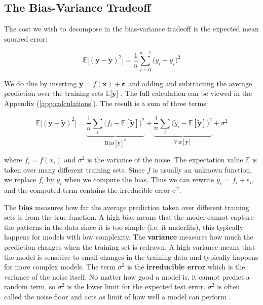 \documentclass[reprint,english,notitlepage]{revtex4-2}  %
\begin{document}
\subsection{The Bias-Variance Tradeoff} \label{sec:bv-tradeoff}

The cost we wish to decompose in the bias-variance tradeoff is the expected mean squared error:

\begin{equation*}
\mathbb{E}\big[(\mathbf{y} - \tilde{\mathbf{y}})^2\big]
= \frac{1}{n}\sum_{i=0}^{n-1} \big(y_i - \tilde{y}_i\big)^2
\end{equation*}

We do this by inserting $\bm{y} = f(\bm{x}) + \bm{\varepsilon}$ and adding and subtracting the average prediction over the training sets $\mathbb{E}\big[\mathbf{\tilde{y}}\big]$ \cite{lecture_book}. The full calculation can be viewed in the Appendix (\ref{app:calculations}). The result is a sum of three terms:

\begin{equation}\label{eq:bias_variance}
\mathbb{E}\big[(\mathbf{y} - \tilde{\mathbf{y}})^2\big]
= \underbrace{\frac{1}{n}\sum_i \big(f_i - \mathbb{E}[\tilde{\mathbf{y}}]\big)^2}_{\mathrm{Bias[\bm{\tilde{y}}]}^2}
+ \underbrace{\frac{1}{n}\sum_i \big(\tilde{y}_i - \mathbb{E}[\tilde{\mathbf{y}}]\big)^2}_{\mathrm{Var}[\tilde{\mathbf{y}}]}
+ \sigma^2
\end{equation}

where $f_i = f(x_i)$ and $\sigma^2$ is the variance of the noise. The expectation value $\mathbb{E}$ is taken over many different training sets. Since $f$ is usually an unknown function, we replace $f_i$ by $y_i$ when we compute the bias. Thus we can rewrite $y_i$ = $f_i + \varepsilon_i$, and the computed term contains the irreducible error $\sigma^2$.

The \textbf{bias} measures how far the average prediction taken over different training sets is from the true function. A high bias means that the model cannot capture the patterns in the data since it is too simple (i.e. it underfits), this typically happens for models with low complexity. The \textbf{variance} measures how much the prediction changes when the training set is redrawn. A high variance means that the model is sensitive to small changes in the training data and typically happens for more complex models. The term $\sigma^2$ is the \textbf{irreducible error} which is the variance of the noise itself. No matter how good a model is, it cannot predict a random term, so $\sigma^2$ is the lower limit for the expected test error. $\sigma^2$ is often called the noise floor and acts as limit of how well a model can perform \cite{lecture_book}. 
\end{document}

